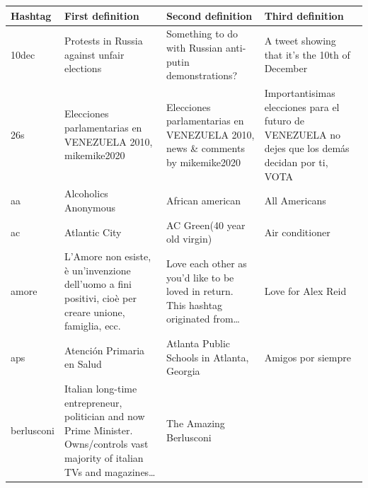 \documentclass[a4paper,11pt,oneside]{article}
\begin{document}
\begin{table}[h]
\centering
    \begin{tabular}{ | l | p{4cm} | p{4cm} | p{4cm} |}
    \hline
Hashtag & First definition & Second definition & Third definition \\ \hline
10dec & \footnotesize{Protests in Russia against unfair elections} & \footnotesize{Something to do with Russian anti-putin demonstrations?} & \footnotesize{A tweet showing that it's the 10th of December}\\
26s & \footnotesize{Elecciones parlamentarias en VENEZUELA 2010, mikemike2020} & \footnotesize{Elecciones parlamentarias en VENEZUELA 2010, news \& comments by mikemike2020} & \footnotesize{Importantisimas elecciones para el futuro de VENEZUELA no dejes que los demás decidan por ti, VOTA}\\
aa & \footnotesize{Alcoholics Anonymous} & \footnotesize{African american } & \footnotesize{All Americans}\\
ac & \footnotesize{Atlantic City} & \footnotesize{AC Green(40 year old virgin)} &  \footnotesize{Air conditioner}\\
amore & \footnotesize{L'Amore non esiste, è un'invenzione dell'uomo a fini positivi, cioè per creare unione, famiglia, ecc. } & \footnotesize{Love each other as you'd like to be loved in return. This hashtag originated from\dots} & \footnotesize{Love for Alex Reid}\\
aps & \footnotesize{Atención Primaria en Salud} & \footnotesize{Atlanta Public Schools in Atlanta, Georgia} & \footnotesize{Amigos por siempre}\\
berlusconi & \footnotesize{Italian long-time entrepreneur, politician and now Prime Minister. Owns/controls vast majority of italian TVs and magazines\dots} & \footnotesize{The Amazing Berlusconi} & \footnotesize{}\\

\end{tabular}
\end{table}
\end{document}
